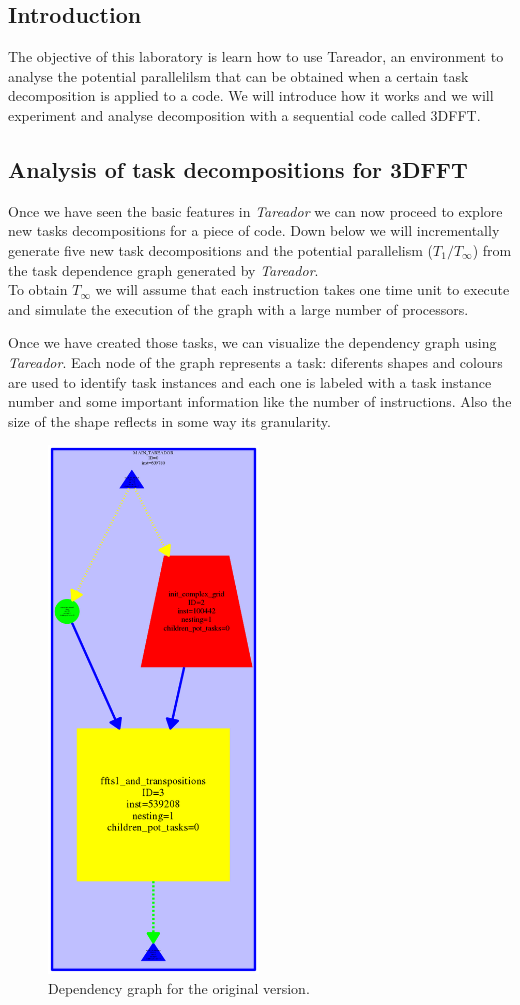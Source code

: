 \documentclass[12]{article}
\begin{document}
\subsection{Introduction}
The objective of this laboratory is learn how to use Tareador, an environment to analyse the potential parallelilsm that can be obtained when a certain task decomposition is applied to a code. We will introduce how it works and we will experiment and analyse decomposition with a sequential code called 3DFFT.

\subsection{Analysis of task decompositions for 3DFFT}

Once we have seen the basic features in \textit{Tareador} we can now proceed to explore new tasks decompositions for a piece of code. Down below we will incrementally generate five new task decompositions and the potential parallelism ($T_1 / T_\infty$) from the task dependence graph generated by \textit{Tareador}. 
\\
To obtain $T_\infty$ we will assume that each instruction takes one time unit to execute and simulate the execution of the graph with a large number of processors.

Once we have created those tasks, we can visualize the dependency graph using \textit{Tareador}. Each node of the graph represents a task: diferents shapes and colours are used to identify task instances and each one is labeled with a task instance number and some important information like the number of instructions. Also the size of the shape reflects in some way its granularity. 
 
\begin{figure}[H]
\centering  \includegraphics[width=.8\linewidth, height=14cm, width=6cm]{images/dependency_graph0.png}
  \caption{Dependency graph for the original version.}
  \label{fig:Depencency0}
\end{figure}
\end{document}
